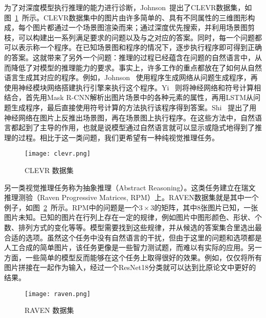 为了对深度模型执行推理的能力进行诊断，Johnson~\etal 提出了CLEVR数据集\cite{johnson2017clevr}，如图~\ref{fig:clevr}~所示。CLEVR数据集中的图片由许多简单的、具有不同属性的三维图形构成，每个图片都通过一个场景图渲染而来；通过深度优先搜索，并利用场景图剪枝，可以构建出一系列满足要求的问题以及与之对应的答案。同时，每一个问题都可以表示称一个程序。在已知场景图和程序的情况下，逐步执行程序即可得到正确的答案。这就带来了另外一个问题：推理的过程已经蕴含在问题的自然语言中，从而降低了对模型的推理能力的要求。事实上，许多工作的重点都放在了如何从自然语言生成其对应的程序。例如，Johnson~\etal\cite{Johnson_2017_ICCV} 使用程序生成网络从问题生成程序，再使用神经模块网络\cite{andreas2016neural}搭建执行引擎来执行这个程序。Yi~\etal\cite{yi2018neural} 则将神经网络和符号计算相结合，首先用Mask R-CNN\cite{he2017mask}解析出图片场景中的各种元素的属性，再用LSTM\cite{hochreiter1997long}从问题生成程序，最后直接使用符号计算的方法执行该程序得到答案。Shi~\etal\cite{shi2019explainable} 提出了用神经网络在图片上反推出场景图，再在场景图上执行程序。在这些方法中，自然语言都起到了主导的作用，也就是说模型通过自然语言就可以显示或隐式地得到了推理的过程。相比于这一类问题，我们更希望有一种纯视觉推理任务。

\begin{figure}
    \centering
    \texttt{[image: clevr.png]}
    \caption{CLEVR 数据集\cite{johnson2017clevr}}
    \label{fig:clevr}
\end{figure}

另一类视觉推理任务称为抽象推理（Abstract Reasoning）\cite{barrett2018measuring,zhang2019raven}。这类任务建立在瑞文推理测验（Raven Progressive Matrices, RPM）上。RAVEN数据集\cite{zhang2019raven}就是其中一个例子，如图~\ref{fig:raven}~所示。RPM中的问题是一个$3\times 3$的矩阵，其中8张图片已知，一张图片未知。已知的图片在行列上存在一定的规律，例如图片中图形颜色、形状、个数、排列方式的变化等等。模型需要找到这些规律，并从候选的答案集合里选出最合适的选项。虽然这个任务中没有自然语言的干扰，但由于这里的问题和选项都是人工合成的简单图片，该任务更像是一些智力测试题，而难以有实际的应用。另一方面，一些简单的模型反而能够在这个任务上取得很好的效果。例如，仅仅将所有图片拼接在一起作为输入，经过一个ResNet18\cite{he2016deep}分类就可以达到比原论文\cite{zhang2019raven}中更好的结果。

\begin{figure}
    \centering
    \texttt{[image: raven.png]}
    \caption{RAVEN 数据集\cite{zhang2019raven}}
    \label{fig:raven}
\end{figure}

